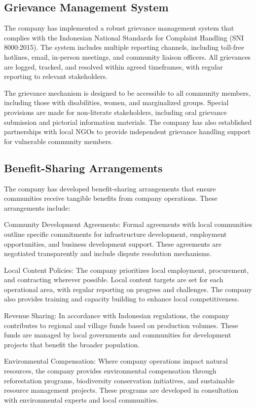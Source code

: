\subsection{Grievance Management System}

The company has implemented a robust grievance management system that complies with the Indonesian National Standards for Complaint Handling (SNI 8000:2015). The system includes multiple reporting channels, including toll-free hotlines, email, in-person meetings, and community liaison officers. All grievances are logged, tracked, and resolved within agreed timeframes, with regular reporting to relevant stakeholders.

The grievance mechanism is designed to be accessible to all community members, including those with disabilities, women, and marginalized groups. Special provisions are made for non-literate stakeholders, including oral grievance submission and pictorial information materials. The company has also established partnerships with local NGOs to provide independent grievance handling support for vulnerable community members.

\subsection{Benefit-Sharing Arrangements}

The company has developed benefit-sharing arrangements that ensure communities receive tangible benefits from company operations. These arrangements include:

Community Development Agreements: Formal agreements with local communities outline specific commitments for infrastructure development, employment opportunities, and business development support. These agreements are negotiated transparently and include dispute resolution mechanisms.

Local Content Policies: The company prioritizes local employment, procurement, and contracting wherever possible. Local content targets are set for each operational area, with regular reporting on progress and challenges. The company also provides training and capacity building to enhance local competitiveness.

Revenue Sharing: In accordance with Indonesian regulations, the company contributes to regional and village funds based on production volumes. These funds are managed by local governments and communities for development projects that benefit the broader population.

Environmental Compensation: Where company operations impact natural resources, the company provides environmental compensation through reforestation programs, biodiversity conservation initiatives, and sustainable resource management projects. These programs are developed in consultation with environmental experts and local communities.

